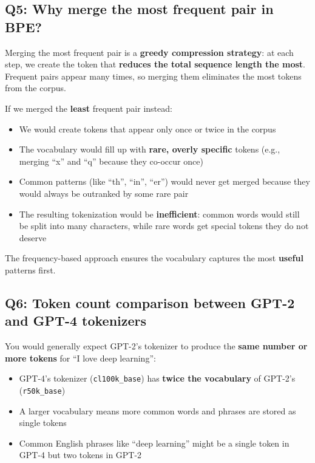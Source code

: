 \documentclass[11pt,a4paper]{article}
\begin{document}
\subsection*{Q5: Why merge the most frequent pair in BPE?}

Merging the most frequent pair is a \textbf{greedy compression strategy}: at each step, we create the token that \textbf{reduces the total sequence length the most}. Frequent pairs appear many times, so merging them eliminates the most tokens from the corpus.

If we merged the \textbf{least} frequent pair instead:
\begin{itemize}[leftmargin=1.5em]
    \item We would create tokens that appear only once or twice in the corpus
    \item The vocabulary would fill up with \textbf{rare, overly specific} tokens (e.g., merging ``x'' and ``q'' because they co-occur once)
    \item Common patterns (like ``th'', ``in'', ``er'') would never get merged because they would always be outranked by some rare pair
    \item The resulting tokenization would be \textbf{inefficient}: common words would still be split into many characters, while rare words get special tokens they do not deserve
\end{itemize}

The frequency-based approach ensures the vocabulary captures the most \textbf{useful} patterns first.

\subsection*{Q6: Token count comparison between GPT-2 and GPT-4 tokenizers}

You would generally expect GPT-2's tokenizer to produce the \textbf{same number or more tokens} for ``I love deep learning'':

\begin{itemize}[leftmargin=1.5em]
    \item GPT-4's tokenizer (\texttt{cl100k\_base}) has \textbf{twice the vocabulary} of GPT-2's (\texttt{r50k\_base})
    \item A larger vocabulary means more common words and phrases are stored as single tokens
    \item Common English phrases like ``deep learning'' might be a single token in GPT-4 but two tokens in GPT-2
\end{itemize}
\end{document}
